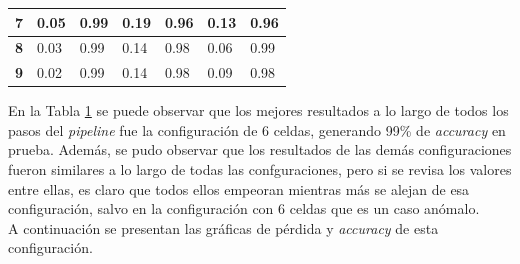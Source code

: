 \begin{table}[h!]
\begin{tabular}{|l|l|l|l|l|l|l|}
\textbf{7}                                                         & 0.05                                                                      & 0.99                                                                       & 0.19                                                                   & 0.96                                                                    & 0.13                                                               & 0.96                                                                \\ \hline
\textbf{8}                                                         & 0.03                                                                      & 0.99                                                                       & 0.14                                                                   & 0.98                                                                    & 0.06                                                               & 0.99                                                                \\ \hline
\textbf{9}                                                         & 0.02                                                                      & 0.99                                                                       & 0.14                                                                   & 0.98                                                                    & 0.09                                                               & 0.98                                                                \\ \hline
\end{tabular}
\label{table:b0Metrics}
\end{table}


En la Tabla \ref{table:b0Metrics} se puede observar 
que los mejores resultados a lo largo de todos los pasos del 
\textit{pipeline} fue la configuración de 6 celdas, generando 99\% de 
\textit{accuracy} en prueba. Además, se pudo observar que los 
resultados de las demás configuraciones fueron similares a lo largo de 
todas las confguraciones, pero si se revisa los valores entre ellas, 
es claro que todos ellos empeoran mientras más se alejan de esa 
configuración, salvo en la configuración con 6 celdas que es un caso 
anómalo.\\

A continuación se presentan las gráficas de pérdida y \textit{accuracy} 
de esta configuración.

